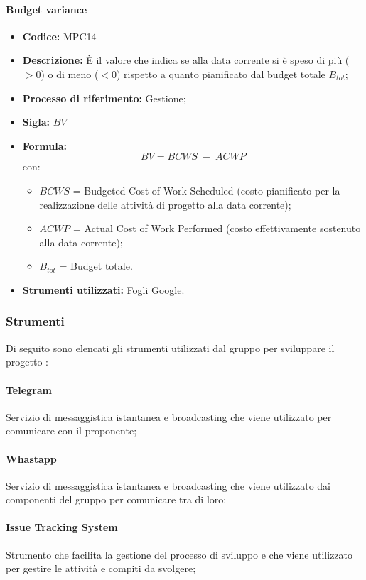 \paragraph{Budget variance}
\begin{itemize}
	\item \textbf{Codice:} MPC14
	\item \textbf{Descrizione:} È il valore che indica se alla data corrente si è speso di più ($>0$) o di meno ($<0$) rispetto a quanto pianificato dal budget totale $B_{tot}$;
	\item \textbf{Processo di riferimento:} Gestione;
	\item \textbf{Sigla:} $BV$
	\item \textbf{Formula:} $$BV = {BCWS \; - \; ACWP}$$
	con:
	\begin{itemize}
		\item $BCWS$ = Budgeted Cost of Work Scheduled (costo pianificato per la realizzazione delle attività di progetto alla data corrente);
		\item $ACWP$ = Actual Cost of Work Performed (costo effettivamente sostenuto alla data corrente);
		\item $B_{tot}$ = Budget totale.
	\end{itemize}
	\item \textbf{Strumenti utilizzati:} Fogli Google.
\end{itemize}

\subsubsection{Strumenti}
Di seguito sono elencati gli strumenti utilizzati dal gruppo per sviluppare il progetto \glo{\NomeProgetto{}}:

\paragraph{Telegram} 
Servizio di messaggistica istantanea e broadcasting che viene utilizzato per comunicare con il proponente;
\paragraph{Whastapp} 
Servizio di messaggistica istantanea e broadcasting che viene utilizzato dai componenti del gruppo per comunicare tra di loro;
\paragraph{Issue Tracking System} 
Strumento che facilita la gestione del processo di sviluppo e che viene utilizzato per gestire le attività e compiti da svolgere;
